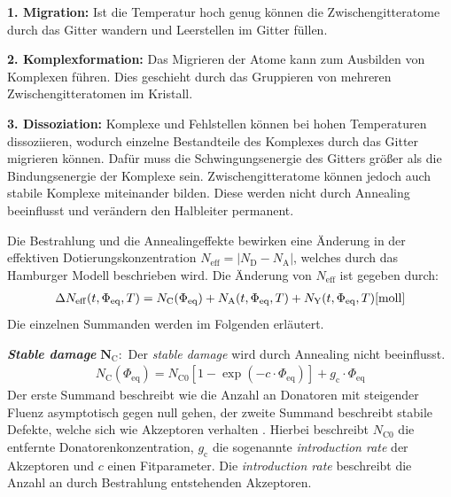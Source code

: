 \textbf{1. Migration:} Ist die Temperatur hoch genug können die Zwischengitteratome durch das Gitter wandern und
Leerstellen im Gitter füllen.

\textbf{2. Komplexformation:} Das Migrieren der Atome kann zum Ausbilden von Komplexen führen. Dies geschieht durch das
Gruppieren von mehreren Zwischengitteratomen im Kristall.

\textbf{3. Dissoziation:} Komplexe und Fehlstellen können bei hohen Temperaturen dissoziieren, wodurch einzelne Bestandteile des Komplexes
durch das Gitter migrieren können. Dafür muss die Schwingungsenergie des Gitters größer als die Bindungsenergie der Komplexe sein.
Zwischengitteratome können jedoch auch stabile Komplexe miteinander bilden.
Diese werden nicht durch Annealing
beeinflusst und verändern den Halbleiter permanent.

Die Bestrahlung und die Annealingeffekte bewirken eine Änderung in der effektiven Dotierungskonzentration
${N_{\mathrm{eff}}= |N_{\mathrm{D}}-N_{\mathrm{A}}|}$,
welches durch das Hamburger Modell beschrieben wird.
Die Änderung von $N_{\mathrm{eff}}$ ist gegeben durch:
\begin{align}
  \Delta N_{\mathrm{eff}}(t, \Phi_{\mathrm{eq}}, T)   = N_{\mathrm{C}}(\Phi_{\mathrm{eq}}) + N_{\mathrm{A}}(t, \Phi_{\mathrm{eq}}, T) + N_{\mathrm{Y}}(t, \Phi_{\mathrm{eq}}, T) \text{\cite{moll}}
  \label{eqn:N_eff}
\end{align}
Die einzelnen Summanden werden im Folgenden erläutert.

\textbf{\textit{Stable damage}} $\symbf{N_{\mathrm{C}}}:$ Der \textit{stable damage} wird durch Annealing nicht beeinflusst.
\begin{align}
  N_{\mathrm{C}}(\Phi_{\mathrm{eq}}) = N_{\mathrm{C0}}[1-\exp{(-c \cdot \Phi_{\mathrm{eq}})}] + g_{\mathrm{c}} \cdot \Phi_{\mathrm{eq}}
\end{align}
Der erste Summand beschreibt wie die Anzahl an Donatoren mit
steigender Fluenz asymptotisch gegen null gehen, der zweite Summand beschreibt stabile Defekte, welche sich wie Akzeptoren verhalten \cite{beyer}.
Hierbei beschreibt $N_{\mathrm{C0}}$ die entfernte Donatorenkonzentration, $g_{\mathrm{c}}$ die sogenannte \textit{introduction rate} der Akzeptoren und $c$ einen Fitparameter.
Die \textit{introduction rate} beschreibt die Anzahl an durch Bestrahlung entstehenden Akzeptoren.

